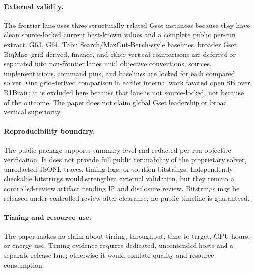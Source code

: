 \documentclass[11pt]{article}
\begin{document}
\paragraph{External validity.}
The frontier lane uses three structurally related Gset instances because they have clean source-locked current best-known values and a complete public per-run extract. G63, G64, Tabu Search/MaxCut-Bench-style baselines, broader Gset, BiqMac, grid-derived, finance, and other vertical comparisons are deferred or separated into non-frontier lanes until objective conventions, sources, implementations, command pins, and baselines are locked for each compared solver. One grid-derived comparison in earlier internal work favored open SB over B1Brain; it is excluded here because that lane is not source-locked, not because of the outcome. The paper does not claim global Gset leadership or broad vertical superiority.

\paragraph{Reproducibility boundary.}
The public package supports summary-level and redacted per-run objective verification. It does not provide full public rerunability of the proprietary solver, unredacted JSONL traces, timing logs, or solution bitstrings. Independently checkable bitstrings would strengthen external validation, but they remain a controlled-review artifact pending IP and disclosure review. Bitstrings may be released under controlled review after clearance; no public timeline is guaranteed.

\paragraph{Timing and resource use.}
The paper makes no claim about timing, throughput, time-to-target, GPU-hours, or energy use. Timing evidence requires dedicated, uncontended hosts and a separate release lane; otherwise it would conflate quality and resource consumption.
\end{document}
